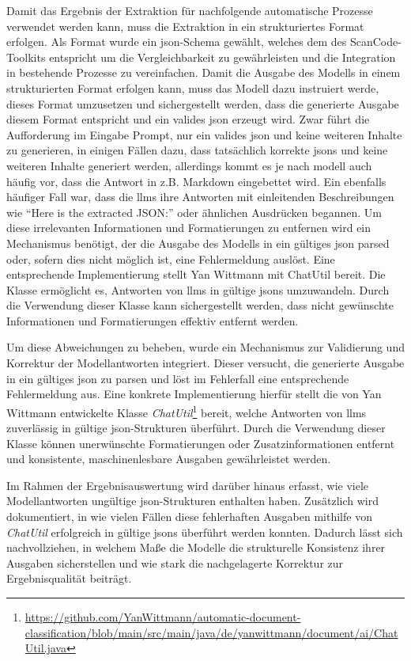Damit das Ergebnis der Extraktion für nachfolgende automatische Prozesse verwendet werden kann, muss die Extraktion in ein strukturiertes Format erfolgen.
Als Format wurde ein \gls{json}-Schema gewählt, welches dem des ScanCode-Toolkits entspricht um die Vergleichbarkeit zu gewährleisten und die Integration in bestehende Prozesse zu vereinfachen.
Damit die Ausgabe des Modells in einem strukturierten Format erfolgen kann, muss das Modell dazu instruiert werde, dieses Format umzusetzen und sichergestellt werden, dass die generierte Ausgabe diesem Format entspricht und ein valides \gls{json} erzeugt wird.
Zwar führt die Aufforderung im Eingabe Prompt, nur ein valides \gls{json} und keine weiteren Inhalte zu generieren, in einigen Fällen dazu, dass tatsächlich korrekte \gls{json}s und keine weiteren Inhalte generiert werden, allerdings kommt es je nach modell auch häufig vor, dass die Antwort in z.B. Markdown eingebettet wird.
Ein ebenfalls häufiger Fall war, dass die \glspl{llm} ihre Antworten mit einleitenden Beschreibungen wie \enquote{Here is the extracted JSON:} oder ähnlichen Ausdrücken begannen.
Um diese irrelevanten Informationen und Formatierungen zu entfernen wird ein Mechanismus benötigt, der die Ausgabe des Modells in ein gültiges \gls{json} parsed oder, sofern dies nicht möglich ist, eine Fehlermeldung auslöst.
Eine entsprechende Implementierung stellt Yan Wittmann mit ChatUtil bereit.
Die Klasse ermöglicht es, Antworten von \glspl{llm} in gültige \gls{json}s umzuwandeln.
Durch die Verwendung dieser Klasse kann sichergestellt werden, dass nicht gewünschte Informationen und Formatierungen effektiv entfernt werden.

Um diese Abweichungen zu beheben, wurde ein Mechanismus zur Validierung und Korrektur der Modellantworten integriert.
Dieser versucht, die generierte Ausgabe in ein gültiges \gls{json} zu parsen und löst im Fehlerfall eine entsprechende Fehlermeldung aus.
Eine konkrete Implementierung hierfür stellt die von Yan Wittmann entwickelte Klasse \textit{ChatUtil}\footnote{\url{https://github.com/YanWittmann/automatic-document-classification/blob/main/src/main/java/de/yanwittmann/document/ai/ChatUtil.java}} bereit, welche Antworten von \glspl{llm} zuverlässig in gültige \gls{json}-Strukturen überführt.
Durch die Verwendung dieser Klasse können unerwünschte Formatierungen oder Zusatzinformationen entfernt und konsistente, maschinenlesbare Ausgaben gewährleistet werden.

Im Rahmen der Ergebnisauswertung wird darüber hinaus erfasst, wie viele Modellantworten ungültige \gls{json}-Strukturen enthalten haben.
Zusätzlich wird dokumentiert, in wie vielen Fällen diese fehlerhaften Ausgaben mithilfe von \textit{ChatUtil} erfolgreich in gültige \gls{json}s überführt werden konnten.
Dadurch lässt sich nachvollziehen, in welchem Maße die Modelle die strukturelle Konsistenz ihrer Ausgaben sicherstellen und wie stark die nachgelagerte Korrektur zur Ergebnisqualität beiträgt.

